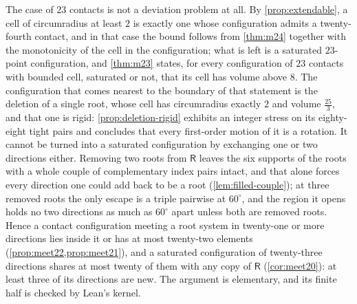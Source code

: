 \documentclass[11pt,reqno]{amsart}
\renewcommand{\_}{\origunderscore\allowbreak}
\numberwithin{equation}{section}
\theoremstyle{plain}
\theoremstyle{definition}
\theoremstyle{remark}
\newcommand{\Rt}{\mathsf{R}}                 %
\begin{document}
The case of $23$ contacts is not a deviation problem at all. By
\cref{prop:extendable}, a cell of circumradius at least $2$ is exactly
one whose configuration admits a twenty-fourth contact, and in that case
the bound follows from \cref{thm:m24} together with the monotonicity of
the cell in the configuration; what is left is a saturated $23$-point
configuration, and \cref{thm:m23} states, for every configuration of
$23$ contacts with bounded cell, saturated or not, that its cell has
volume above $8$. The configuration that comes nearest to the boundary
of that statement is the deletion of a single root, whose cell has
circumradius exactly $2$ and volume $\tfrac{25}3$, and that one is
rigid: \cref{prop:deletion-rigid} exhibits an integer stress on its
eighty-eight tight pairs and concludes that every first-order motion of
it is a rotation. It cannot be turned into a saturated configuration by
exchanging one or two directions either. Removing two roots from $\Rt$
leaves the six supports of the roots with a whole couple of
complementary index pairs intact, and that alone forces every direction
one could add back to be a root (\cref{lem:filled-couple}); at three
removed roots the only escape is a triple pairwise at $60^\circ$, and
the region it opens holds no two directions as much as $60^\circ$ apart
unless both are removed roots. Hence a contact configuration meeting a
root system in twenty-one or more directions lies inside it or has at
most twenty-two elements (\cref{prop:meet22,prop:meet21}), and a
saturated configuration of twenty-three directions shares at most twenty
of them with any copy of $\Rt$ (\cref{cor:meet20}): at least three of
its directions are new. The argument is elementary, and its finite half
is checked by Lean's kernel.
\end{document}
